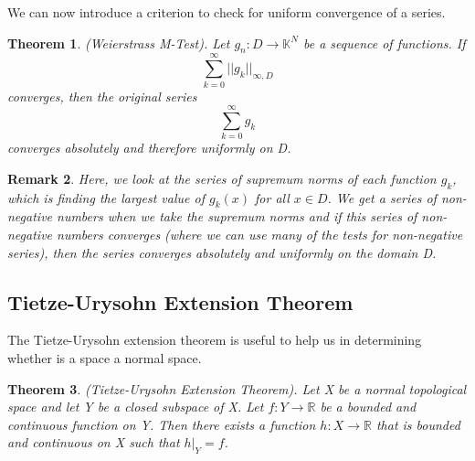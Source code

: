\documentclass[twoside]{article}
\newcounter{lecnum}
\newtheorem{theorem}{Theorem}[lecnum]
\newtheorem{remark}[theorem]{Remark}
\begin{document}
We can now introduce a criterion to check for uniform convergence of a series.

\begin{theorem}(Weierstrass M-Test). Let $g_n: D \rightarrow \mathbb{K}^N$ be a sequence of functions. If
$$
\sum_{k=0}^{\infty}||g_k||_{\infty, D}
$$
converges, then the original series
$$
\sum_{k=0}^{\infty}g_k
$$
converges absolutely and therefore uniformly on D.
\end{theorem}

\begin{remark} Here, we look at the series of supremum norms of each function $g_k$, which is finding the largest value of $g_k(x)$ for all $x \in D$. We get a series of non-negative numbers when we take the supremum norms and if this series of non-negative numbers converges (where we can use many of the tests for non-negative series), then the series converges absolutely and uniformly on the domain D. 
\end{remark}

\subsection{Tietze-Urysohn Extension Theorem}

The Tietze-Urysohn extension theorem is useful to help us in determining whether is a space a normal space.

\begin{theorem}(Tietze-Urysohn Extension Theorem). Let X be a normal topological space and let Y be a closed subspace of X. Let $f:Y \rightarrow \mathbb{R}$ be a bounded and continuous function on Y. Then there exists a function $h:X \rightarrow \mathbb{R}$ that is bounded and continuous on X such that $h|_Y = f$.
\end{theorem}
\end{document}
